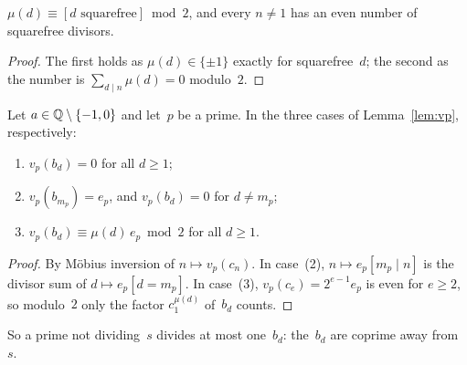 \begin{lemma}
  \label{lem:moebius-two}
  \leanok
  $\mu(d) \equiv [d \text{ squarefree}] \bmod 2$, and every $n \ne 1$ has an even number of
  squarefree divisors.
\end{lemma}
\begin{proof}
  \leanok
  The first holds as $\mu(d) \in \{\pm 1\}$ exactly for squarefree~$d$; the second as the number
  is $\sum_{d \mid n} \mu(d) = 0$ modulo~$2$.
\end{proof}

\begin{lemma}
  \label{lem:bseq-val}
  \leanok
  Let $a \in \mathbb{Q} \setminus \{-1, 0\}$ and let~$p$ be a prime. In the three cases of
  Lemma~\ref{lem:vp}, respectively:
  \begin{enumerate}
    \item $v_p(b_d) = 0$ for all $d \ge 1$;
    \item $v_p(b_{m_p}) = e_p$, and $v_p(b_d) = 0$ for $d \ne m_p$;
    \item $v_p(b_d) \equiv \mu(d)\, e_p \bmod 2$ for all $d \ge 1$.
  \end{enumerate}
\end{lemma}
\begin{proof}
  \leanok
  By Möbius inversion of $n \mapsto v_p(c_n)$. In case~(2), $n \mapsto e_p [m_p \mid n]$ is the
  divisor sum of $d \mapsto e_p [d = m_p]$. In case~(3), $v_p(c_e) = 2^{e-1} e_p$ is even
  for $e \ge 2$, so modulo~$2$ only the factor $c_1^{\mu(d)}$ of~$b_d$ counts.
\end{proof}

So a prime not dividing~$s$ divides at most one~$b_d$: the~$b_d$ are coprime away from~$s$.

